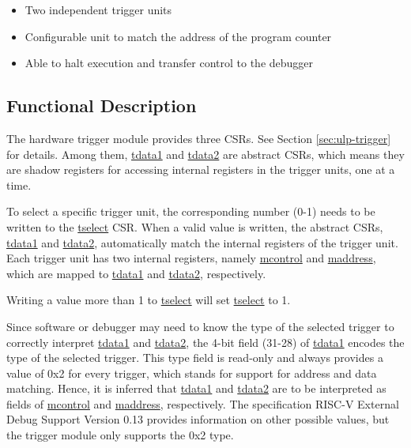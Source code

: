 \documentclass[main\_\_EN.tex]{subfiles}
\begin{document}
\begin{itemize}
    \item Two independent trigger units
    \item Configurable unit to match the address of the program counter
    \item Able to halt execution and transfer control to the debugger

\end{itemize}

\subsection{Functional Description}
\label{sec:ulp-hwt-func-descr}

The hardware trigger module provides three CSRs. See Section \ref{sec:ulp-trigger} for details. Among them, \hyperref[regdesc:LPTDATA1]{tdata1} and \hyperref[regdesc:LPTDATA2]{tdata2} are abstract CSRs, which means they are shadow registers for accessing internal registers in the trigger units, one at a time.

To select a specific trigger unit, the corresponding number (0-1) needs to be written to the \hyperref[regdesc:LPTSELECT]{tselect} CSR. When a valid value is written, the abstract CSRs, \hyperref[regdesc:LPTDATA1]{tdata1} and \hyperref[regdesc:LPTDATA2]{tdata2}, automatically match the internal registers of the trigger unit. Each trigger unit has two internal registers, namely \hyperref[regdesc:LPMCONTROL]{mcontrol} and \hyperref[regdesc:LPMADDRESS]{maddress}, which are mapped to \hyperref[regdesc:LPTDATA1]{tdata1} and \hyperref[regdesc:LPTDATA2]{tdata2}, respectively.

Writing a value more than 1 to \hyperref[regdesc:LPTSELECT]{tselect} will set \hyperref[regdesc:LPTSELECT]{tselect} to 1.

Since software or debugger may need to know the type of the selected trigger to correctly interpret \hyperref[regdesc:LPTDATA1]{tdata1} and \hyperref[regdesc:LPTDATA2]{tdata2}, the 4-bit field (31-28) of \hyperref[regdesc:LPTDATA1]{tdata1} encodes the type of the selected trigger. This type field is read-only and always provides a value of 0x2 for every trigger, which stands for support for address and data matching. Hence, it is inferred that \hyperref[regdesc:LPTDATA1]{tdata1} and \hyperref[regdesc:LPTDATA2]{tdata2} are to be interpreted as fields of \hyperref[regdesc:LPMCONTROL]{mcontrol} and \hyperref[regdesc:LPMADDRESS]{maddress}, respectively. The specification RISC-V External Debug Support Version 0.13 provides information on other possible values, but the trigger module only supports the 0x2 type.
\end{document}
